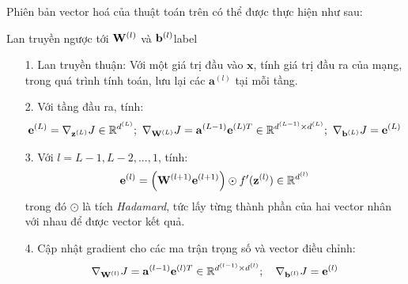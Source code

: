 Phiên bản vector hoá của thuật toán trên có thể được thực hiện như
sau:
\begin{myalg}{Lan truyền ngược tới $\mathbf{W}^{(l)}$ và $\mathbf{b}^{(l)}$}{label}
\begin{enumerate}
\item[1.] Lan truyền thuận: Với một giá trị đầu vào $\mathbf{x}$, tính giá trị đầu
ra của mạng, trong quá trình tính toán, lưu lại các $\mathbf{a}^{(l)}$ tại mỗi tầng.

\item[2.] Với tầng đầu ra, tính:
\begin{eqnarray*}
\mathbf{e}^{(L)} = \nabla_{\mathbf{z}^{(L)}}J \in
\mathbb{R}^{d^{(L)}};~
\nabla_{\mathbf{W}^{(L)}}J =
\mathbf{a}^{(L-1)}\mathbf{e}^{(L)T} \in \mathbb{R}^{d^{(L-1)}\times d^{(L)}};
~
\nabla_{\mathbf{b}^{(L)}}J =  \mathbf{e}^{(L)}
\end{eqnarray*}
\item[3.] Với $l = L-1, L-2, ..., 1$, tính:
\begin{equation}
\mathbf{e}^{(l)} = \left( \mathbf{W}^{(l+1)} \mathbf{e}^{(l+1)} \right)
\odot f'(\mathbf{z}^{(l)}) \in \mathbb{R}^{d^{(l)}}
\end{equation}
trong đó $\odot$ là tích \textit{Hadamard}, tức lấy từng thành phần của hai vector nhân với nhau để được vector kết quả.
\item[4.] Cập nhật gradient cho các ma trận trọng số và vector điều chỉnh:
\begin{eqnarray}
\nabla_{\mathbf{W}^{(l)}}J =
\mathbf{a}^{(l-1)}\mathbf{e}^{(l)T} \in \mathbb{R}^{d^{(l-1)}\times d^{(l)}}; \quad
\nabla_{\mathbf{b}^{(l)}}J = \mathbf{e}^{(l)}
\end{eqnarray}
\end{enumerate}
\end{myalg}

